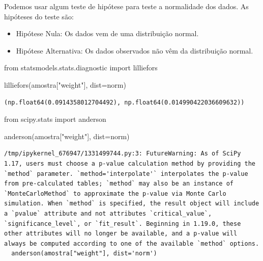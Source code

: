 \documentclass[
  letterpaper,
  DIV=11,
  numbers=noendperiod]{scrreprt}
\newenvironment{Shaded}{\begin{snugshade}}{\end{snugshade}}
\newcommand{\ImportTok}[1]{\textcolor[rgb]{0.00,0.46,0.62}{#1}}
\newcommand{\NormalTok}[1]{\textcolor[rgb]{0.00,0.23,0.31}{#1}}
\newcommand{\OperatorTok}[1]{\textcolor[rgb]{0.37,0.37,0.37}{#1}}
\newcommand{\StringTok}[1]{\textcolor[rgb]{0.13,0.47,0.30}{#1}}
\begin{document}
Podemos usar algum teste de hipótese para teste a normalidade dos dados.
As hipóteses do teste são:

\begin{itemize}
\item
  Hipótese Nula: Os dados vem de uma distribuição normal.
\item
  Hipótese Alternativa: Os dados observados não vêm da distribuição
  normal.
\end{itemize}

\begin{Shaded}
\begin{Highlighting}[]
\ImportTok{from}\NormalTok{ statsmodels.stats.diagnostic }\ImportTok{import}\NormalTok{ lilliefors}

\NormalTok{lilliefors(amostra[}\StringTok{"weight"}\NormalTok{], dist}\OperatorTok{=}\StringTok{\textquotesingle{}norm\textquotesingle{}}\NormalTok{)}
\end{Highlighting}
\end{Shaded}

\begin{verbatim}
(np.float64(0.0914358012704492), np.float64(0.014990422036609632))
\end{verbatim}

\begin{Shaded}
\begin{Highlighting}[]
\ImportTok{from}\NormalTok{ scipy.stats }\ImportTok{import}\NormalTok{ anderson}

\NormalTok{anderson(amostra[}\StringTok{"weight"}\NormalTok{], dist}\OperatorTok{=}\StringTok{\textquotesingle{}norm\textquotesingle{}}\NormalTok{)}
\end{Highlighting}
\end{Shaded}

\begin{verbatim}
/tmp/ipykernel_676947/1331499744.py:3: FutureWarning: As of SciPy 1.17, users must choose a p-value calculation method by providing the `method` parameter. `method='interpolate'` interpolates the p-value from pre-calculated tables; `method` may also be an instance of `MonteCarloMethod` to approximate the p-value via Monte Carlo simulation. When `method` is specified, the result object will include a `pvalue` attribute and not attributes `critical_value`, `significance_level`, or `fit_result`. Beginning in 1.19.0, these other attributes will no longer be available, and a p-value will always be computed according to one of the available `method` options.
  anderson(amostra["weight"], dist='norm')
\end{verbatim}
\end{document}
